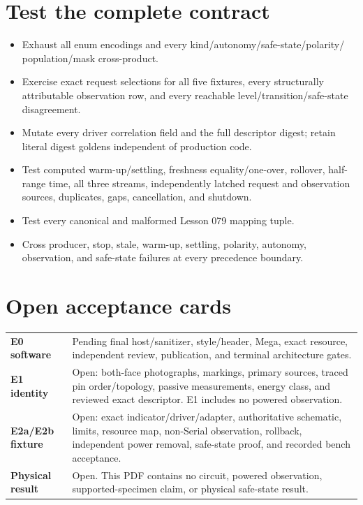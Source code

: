 \documentclass[10pt]{article}
\begin{document}
\section{Test the complete contract}
\begin{itemize}
 \item Exhaust all enum encodings and every kind/autonomy/safe-state/polarity/
       population/mask cross-product.
 \item Exercise exact request selections for all five fixtures, every
       structurally attributable observation row, and every reachable
       level/transition/safe-state disagreement.
 \item Mutate every driver correlation field and the full descriptor digest;
       retain literal digest goldens independent of production code.
 \item Test computed warm-up/settling, freshness equality/one-over, rollover,
       half-range time, all three streams, independently latched request and
       observation sources, duplicates, gaps, cancellation, and shutdown.
 \item Test every canonical and malformed Lesson 079 mapping tuple.
 \item Cross producer, stop, stale, warm-up, settling, polarity, autonomy,
       observation, and safe-state failures at every precedence boundary.
\end{itemize}

\section{Open acceptance cards}
\begin{tabularx}{\linewidth}{@{}>{\bfseries}l X@{}}
E0 software & Pending final host/sanitizer, style/header, Mega, exact resource,
independent review, publication, and terminal architecture gates.\\
E1 identity & Open: both-face photographs, markings, primary sources, traced
pin order/topology, passive measurements, energy class, and reviewed exact
descriptor. E1 includes no powered observation.\\
E2a/E2b fixture & Open: exact indicator/driver/adapter, authoritative
schematic, limits, resource map, non-Serial observation, rollback, independent
power removal, safe-state proof, and recorded bench acceptance.\\
Physical result & Open. This PDF contains no circuit, powered observation,
supported-specimen claim, or physical safe-state result.\\
\end{tabularx}
\end{document}
